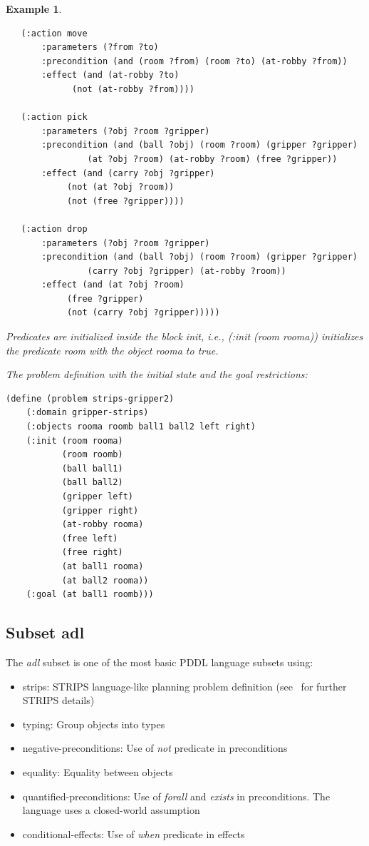 \documentclass{report}
\theoremstyle{plain}
\newtheorem{example}{Example}[section]
\begin{document}
\begin{example}
\begin{lstlisting}
   (:action move
       :parameters (?from ?to)
       :precondition (and (room ?from) (room ?to) (at-robby ?from))
       :effect (and (at-robby ?to)
             (not (at-robby ?from))))

   (:action pick
       :parameters (?obj ?room ?gripper)
       :precondition (and (ball ?obj) (room ?room) (gripper ?gripper)
                (at ?obj ?room) (at-robby ?room) (free ?gripper))
       :effect (and (carry ?obj ?gripper)
            (not (at ?obj ?room)) 
            (not (free ?gripper))))

   (:action drop
       :parameters (?obj ?room ?gripper)
       :precondition (and (ball ?obj) (room ?room) (gripper ?gripper)
                (carry ?obj ?gripper) (at-robby ?room))
       :effect (and (at ?obj ?room)
            (free ?gripper)
            (not (carry ?obj ?gripper)))))
\end{lstlisting}

Predicates are initialized inside the block \textit{init}, i.e., \textit{(:init (room rooma))} initializes the predicate \textit{room} with the object \textit{rooma} to true.

The problem definition with the initial state and the goal restrictions:
\begin{lstlisting}
(define (problem strips-gripper2)
    (:domain gripper-strips)
    (:objects rooma roomb ball1 ball2 left right)
    (:init (room rooma)
           (room roomb)
           (ball ball1)
           (ball ball2)
           (gripper left)
           (gripper right)
           (at-robby rooma)
           (free left)
           (free right)
           (at ball1 rooma)
           (at ball2 rooma))
    (:goal (at ball1 roomb)))
\end{lstlisting}
\end{example}

\subsection{Subset adl}
The \emph{adl} subset is one of the most basic PDDL language subsets using:
\begin{itemize}
    \item strips: STRIPS language-like planning problem definition (see~\cite{wiki:strips} for further STRIPS details)
    \item typing: Group objects into types
    \item negative-preconditions: Use of \emph{not} predicate in preconditions
    \item equality: Equality between objects
    \item quantified-preconditions: Use of \emph{forall} and \emph{exists} in preconditions. The language uses a closed-world assumption
    \item conditional-effects: Use of \emph{when} predicate in effects
\end{itemize}
\end{document}
